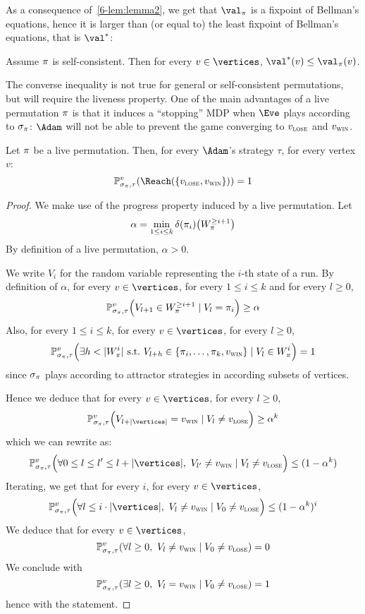 As a consequence of~\cref{6-lem:lemma2}, we get that $\val_\perm$
is a fixpoint of Bellman's equations, hence it is larger than (or
equal to) the least fixpoint of Bellman's equations, that is $\val^*$:

\begin{corollary}
\label{6-cor:self-consistent_solution}
Assume $\pi$ is self-consistent.  Then for every $v \in
\vertices$, $\val^*(v) \le \val_\perm(v)$.
\end{corollary}

The converse inequality is not true for general or self-consistent
permutations, but will require the liveness property. One of the main
advantages of a live permutation $\pi$ is that it induces a
``stopping'' MDP when $\Eve$ plays according to $\sigma_\pi$: 
$\Adam$ will not be able to prevent the game converging to $v_{\textsc{lose}}$ and $v_{\textsc{win}}$.

\begin{lemma}
\label{6-lem:live_stopping}
Let $\pi$ be a live permutation. Then, for every $\Adam$'s strategy
$\tau$, for every vertex $v$:
\[
\probm^v_{\sigma_\perm,\tau} (\Reach(\{\vlose,\vwin\})) = 1
\]
\end{lemma}

\begin{proof}
We make use of the progress property induced by a live permutation.
Let
\[
\alpha = \min_{1 \le i \le k} \delta(\pi_i) \big(W_\pi^{\ge
  i+1}\big)
\]
By definition of a live permutation, $\alpha>0$.

We write $V_i$ for the random variable representing the $i$-th state
of a run.
%
By definition of $\alpha$, for every $v \in \vertices$, for every $1
\le i \le k$ and for every $l \ge 0$,
\[
\mathbb{P}^v_{\sigma_\pi,\tau}\Big(V_{l+1} \in W_\pi^{\ge i+1} \mid
V_l = \pi_i\Big) \ge \alpha
\]
Also, for every $1 \le i \le k$, for every $v \in \vertices$, for
every $l \ge 0$,
\[
\mathbb{P}^v_{\sigma_\pi,\tau}\Big(\exists h < |W_\pi^i|\
\text{s.t.}\ V_{l+h} \in \{\pi_i,\ldots,\pi_k,v_{\textsc{win}}\} \mid V_l
\in W_\pi^i\Big)=1
\]
since $\sigma_\pi$ plays according to attractor strategies in
according subsets of vertices.

Hence we deduce that for every $v \in \vertices$, for every $l \ge
0$,
\[
\probm^v_{\sigma_\perm,\tau}\Big(V_{l+|\vertices|}=\vwin \mid V_l
\ne \vlose\Big) \ge \alpha^k
\]
which we can rewrite as:
\[
\probm^v_{\sigma_\perm,\tau}\Big(\forall 0 \le l \le l' \le
l+|\vertices|,\ V_{l'} \ne \vwin \mid V_l \ne \vlose\Big) \le
(1-\alpha^k)
\]
Iterating, we get that for every $i$, for every $v \in \vertices$,
\[
\probm^v_{\sigma_\perm,\tau}\Big(\forall l \le i \cdot |\vertices|,\
V_{l} \ne \vwin \mid V_0 \ne \vlose\Big) \le (1-\alpha^k)^i
\]
We  deduce that for every $v \in \vertices$,
\[
\probm^v_{\sigma_\perm,\tau}(\forall l \ge 0,\ V_l \ne \vwin \mid
V_0 \ne \vlose) = 0
\]
We conclude with
\[
\probm^v_{\sigma_\perm,\tau}(\exists l \ge 0,\ V_l = \vwin \mid V_0
\ne \vlose) = 1
\]
hence with the statement.
\end{proof}

